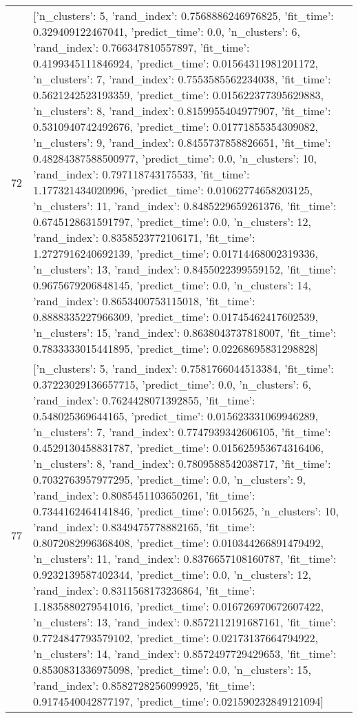 \begin{tabular}{rl}
72 & [{'n_clusters': 5, 'rand_index': 0.7568886246976825, 'fit_time': 0.329409122467041, 'predict_time': 0.0}, {'n_clusters': 6, 'rand_index': 0.766347810557897, 'fit_time': 0.4199345111846924, 'predict_time': 0.01564311981201172}, {'n_clusters': 7, 'rand_index': 0.7553585562234038, 'fit_time': 0.5621242523193359, 'predict_time': 0.015622377395629883}, {'n_clusters': 8, 'rand_index': 0.8159955404977907, 'fit_time': 0.5310940742492676, 'predict_time': 0.01771855354309082}, {'n_clusters': 9, 'rand_index': 0.8455737858826651, 'fit_time': 0.48284387588500977, 'predict_time': 0.0}, {'n_clusters': 10, 'rand_index': 0.797118743175533, 'fit_time': 1.177321434020996, 'predict_time': 0.01062774658203125}, {'n_clusters': 11, 'rand_index': 0.8485229659261376, 'fit_time': 0.6745128631591797, 'predict_time': 0.0}, {'n_clusters': 12, 'rand_index': 0.8358523772106171, 'fit_time': 1.2727916240692139, 'predict_time': 0.01714468002319336}, {'n_clusters': 13, 'rand_index': 0.8455022399559152, 'fit_time': 0.9675679206848145, 'predict_time': 0.0}, {'n_clusters': 14, 'rand_index': 0.8653400753115018, 'fit_time': 0.8888335227966309, 'predict_time': 0.01745462417602539}, {'n_clusters': 15, 'rand_index': 0.8638043737818007, 'fit_time': 0.7833333015441895, 'predict_time': 0.02268695831298828}] \\
77 & [{'n_clusters': 5, 'rand_index': 0.7581766044513384, 'fit_time': 0.37223029136657715, 'predict_time': 0.0}, {'n_clusters': 6, 'rand_index': 0.7624428071392855, 'fit_time': 0.548025369644165, 'predict_time': 0.015623331069946289}, {'n_clusters': 7, 'rand_index': 0.7747939342606105, 'fit_time': 0.4529130458831787, 'predict_time': 0.015625953674316406}, {'n_clusters': 8, 'rand_index': 0.7809588542038717, 'fit_time': 0.7032763957977295, 'predict_time': 0.0}, {'n_clusters': 9, 'rand_index': 0.8085451103650261, 'fit_time': 0.7344162464141846, 'predict_time': 0.015625}, {'n_clusters': 10, 'rand_index': 0.8349475778882165, 'fit_time': 0.8072082996368408, 'predict_time': 0.010344266891479492}, {'n_clusters': 11, 'rand_index': 0.8376657108160787, 'fit_time': 0.9232139587402344, 'predict_time': 0.0}, {'n_clusters': 12, 'rand_index': 0.8311568173236864, 'fit_time': 1.1835880279541016, 'predict_time': 0.016726970672607422}, {'n_clusters': 13, 'rand_index': 0.8572112191687161, 'fit_time': 0.7724847793579102, 'predict_time': 0.02173137664794922}, {'n_clusters': 14, 'rand_index': 0.8572497729429653, 'fit_time': 0.8530831336975098, 'predict_time': 0.0}, {'n_clusters': 15, 'rand_index': 0.8582728256099925, 'fit_time': 0.9174540042877197, 'predict_time': 0.021590232849121094}] \\

\end{tabular}
